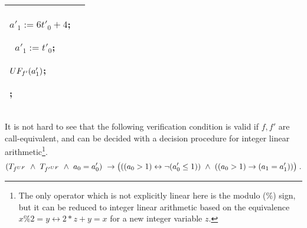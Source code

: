 {{\begin{tabular}{p{6 cm}p{6 cm}}
\begin{algorithmic}
\If {$a'_0\% 2$}

\State $a'_1 := 6t'_0 + 4$;

\Else\ $a'_1 := t'_0$;

\EndIf

\State $UF_{f'}(a'_1)$;

\State \Return 1;
\EndFunction
\end{algorithmic} \\ \hline
\end{tabular}
\vspace{0.3 cm}
}

\noindent It is not hard to see that the following verification condition is valid if $f,f'$ are call-equivalent, and can be decided with a decision procedure for integer linear arithmetic\footnote{The only operator which is not explicitly linear here is the modulo ($\%$) sign, but it can be reduced to integer linear arithmetic based on the equivalence $x \% 2 = y \leftrightarrow 2 * z + y = x$ for a new integer variable $z$.}.
%
\begin{equation}
(T_{\upbody{f}} \ \land\ T_{\upbody{f'}}\ \land\ a_0 = a'_0)\ \rightarrow
\big(((a_0 > 1) \leftrightarrow \lnot(a'_0 \leq 1))\ \land\ ((a_0 > 1) \rightarrow (a_1 = a'_1)) \big)\;.
\end{equation}
%


} 